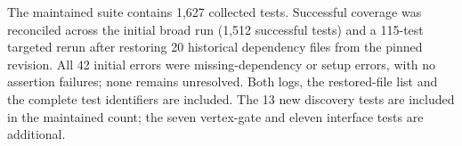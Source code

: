 The maintained suite contains 1,627 collected tests. Successful coverage
was reconciled across the initial broad run (1,512 successful tests) and a
115-test targeted rerun after restoring 20 historical dependency files
from the pinned revision. All 42 initial errors were missing-dependency
or setup errors, with no assertion failures; none remains unresolved.
Both logs, the restored-file list and the complete test identifiers are
included. The 13 new discovery tests are included in the maintained count;
the seven vertex-gate and eleven interface tests are additional.
